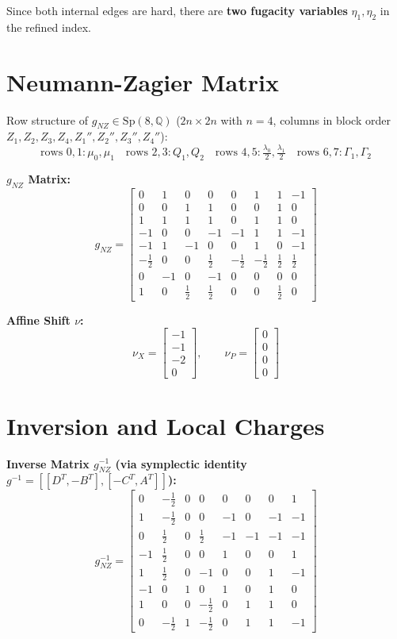 \documentclass[12pt]{article}
\begin{document}
Since both internal edges are hard, there are \textbf{two fugacity variables} $\eta_1, \eta_2$ in the refined index.

\section{Neumann-Zagier Matrix}
Row structure of $g_{NZ} \in \mathrm{Sp}(8,\mathbb{Q})$
($2n \times 2n$ with $n=4$, columns in block order $Z_1, Z_2, Z_3, Z_4, Z_1'', Z_2'', Z_3'', Z_4''$):
\[
\text{rows } 0,1: \mu_0, \mu_1 \quad
\text{rows } 2,3: Q_1, Q_2 \quad
\text{rows } 4,5: \tfrac{\lambda_0}{2}, \tfrac{\lambda_1}{2} \quad
\text{rows } 6,7: \Gamma_1, \Gamma_2
\]

\textbf{$g_{NZ}$ Matrix:}
\[ g_{NZ} = \begin{bmatrix}
 0 &  1 &  0 &  0 &  0 &  1 &  1 & -1 \\
 0 &  0 &  1 &  1 &  0 &  0 &  1 &  0 \\
 1 &  1 &  1 &  1 &  0 &  1 &  1 &  0 \\
-1 &  0 &  0 & -1 & -1 &  1 &  1 & -1 \\
-1 &  1 & -1 &  0 &  0 &  1 &  0 & -1 \\
-\frac{1}{2} &  0 &  0 &  \frac{1}{2} & -\frac{1}{2} & -\frac{1}{2} &  \frac{1}{2} &  \frac{1}{2} \\
 0 & -1 &  0 & -1 &  0 &  0 &  0 &  0 \\
 1 &  0 &  \frac{1}{2} &  \frac{1}{2} &  0 &  0 &  \frac{1}{2} &  0
\end{bmatrix} \]

\textbf{Affine Shift $\nu$:}
\[
\nu_X = \begin{bmatrix} -1 \\ -1 \\ -2 \\ 0 \end{bmatrix}, \qquad
\nu_P = \begin{bmatrix} 0 \\ 0 \\ 0 \\ 0 \end{bmatrix}
\]

\section{Inversion and Local Charges}
\textbf{Inverse Matrix $g_{NZ}^{-1}$ (via symplectic identity $g^{-1} = [[D^T, -B^T],[-C^T, A^T]]$):}
\[ g_{NZ}^{-1} = \begin{bmatrix}
 0 & -\frac{1}{2} &  0 &  0 &  0 &  0 &  0 &  1 \\
 1 & -\frac{1}{2} &  0 &  0 & -1 &  0 & -1 & -1 \\
 0 &  \frac{1}{2} &  0 &  \frac{1}{2} & -1 & -1 & -1 & -1 \\
-1 &  \frac{1}{2} &  0 &  0 &  1 &  0 &  0 &  1 \\
 1 &  \frac{1}{2} &  0 & -1 &  0 &  0 &  1 & -1 \\
-1 &  0 &  1 &  0 &  1 &  0 &  1 &  0 \\
 1 &  0 &  0 & -\frac{1}{2} &  0 &  1 &  1 &  0 \\
 0 & -\frac{1}{2} &  1 & -\frac{1}{2} &  0 &  1 &  1 & -1
\end{bmatrix} \]
\end{document}
